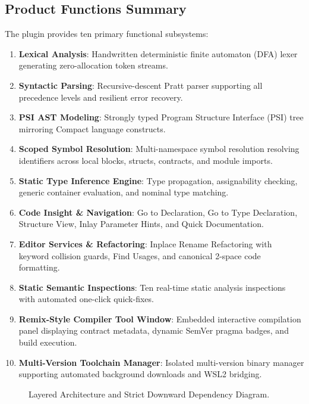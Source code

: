 \subsection{Product Functions Summary}
The plugin provides ten primary functional subsystems:
\begin{enumerate}
    \item \textbf{Lexical Analysis}: Handwritten deterministic finite automaton (DFA) lexer generating zero-allocation token streams.
    \item \textbf{Syntactic Parsing}: Recursive-descent Pratt parser supporting all precedence levels and resilient error recovery.
    \item \textbf{PSI AST Modeling}: Strongly typed Program Structure Interface (PSI) tree mirroring Compact language constructs.
    \item \textbf{Scoped Symbol Resolution}: Multi-namespace symbol resolution resolving identifiers across local blocks, structs, contracts, and module imports.
    \item \textbf{Static Type Inference Engine}: Type propagation, assignability checking, generic container evaluation, and nominal type matching.
    \item \textbf{Code Insight \& Navigation}: Go to Declaration, Go to Type Declaration, Structure View, Inlay Parameter Hints, and Quick Documentation.
    \item \textbf{Editor Services \& Refactoring}: Inplace Rename Refactoring with keyword collision guards, Find Usages, and canonical 2-space code formatting.
    \item \textbf{Static Semantic Inspections}: Ten real-time static analysis inspections with automated one-click quick-fixes.
    \item \textbf{Remix-Style Compiler Tool Window}: Embedded interactive compilation panel displaying contract metadata, dynamic SemVer pragma badges, and build execution.
    \item \textbf{Multi-Version Toolchain Manager}: Isolated multi-version binary manager supporting automated background downloads and WSL2 bridging.
\end{enumerate}

\begin{figure}[htbp]
    \centering
    
    \caption{Layered Architecture and Strict Downward Dependency Diagram.}
    \label{fig:architecture_diagram}
\end{figure}


